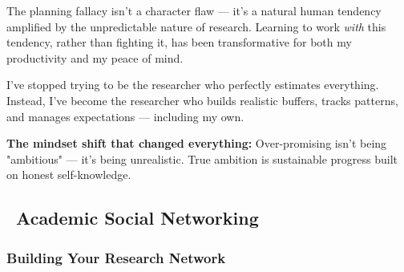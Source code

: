 \documentclass[11pt,a4paper]{article}
\begin{document}
\begin{tcolorbox}[colback=purple!5,colframe=purple!40,title={\faHeart~My Personal Realization}]
The planning fallacy isn't a character flaw — it's a natural human tendency amplified by the unpredictable nature of research. Learning to work \textit{with} this tendency, rather than fighting it, has been transformative for both my productivity and my peace of mind.

I've stopped trying to be the researcher who perfectly estimates everything. Instead, I've become the researcher who builds realistic buffers, tracks patterns, and manages expectations — including my own.

\textbf{The mindset shift that changed everything:} Over-promising isn't being "ambitious" — it's being unrealistic. True ambition is sustainable progress built on honest self-knowledge.
\end{tcolorbox}

\subsection{\faNetworkWired~Academic Social Networking}

\subsubsection{Building Your Research Network}
\end{document}

